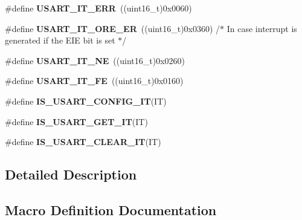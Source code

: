 \begin{DoxyCompactItemize}
\item 
\#define {\bfseries U\+S\+A\+R\+T\+\_\+\+I\+T\+\_\+\+E\+RR}~((uint16\+\_\+t)0x0060)\hypertarget{group___u_s_a_r_t___interrupt__definition_ga631e83efd4c4789128d80a9539faf78a}{}\label{group___u_s_a_r_t___interrupt__definition_ga631e83efd4c4789128d80a9539faf78a}

\item 
\#define {\bfseries U\+S\+A\+R\+T\+\_\+\+I\+T\+\_\+\+O\+R\+E\+\_\+\+ER}~((uint16\+\_\+t)0x0360) /$\ast$ In case interrupt is generated if the E\+I\+E bit is set $\ast$/\hypertarget{group___u_s_a_r_t___interrupt__definition_ga1faa2d618b7c1038f8cad50fec7d0ba4}{}\label{group___u_s_a_r_t___interrupt__definition_ga1faa2d618b7c1038f8cad50fec7d0ba4}

\item 
\#define {\bfseries U\+S\+A\+R\+T\+\_\+\+I\+T\+\_\+\+NE}~((uint16\+\_\+t)0x0260)\hypertarget{group___u_s_a_r_t___interrupt__definition_gad5de042f579b50f1e8643009176486b3}{}\label{group___u_s_a_r_t___interrupt__definition_gad5de042f579b50f1e8643009176486b3}

\item 
\#define {\bfseries U\+S\+A\+R\+T\+\_\+\+I\+T\+\_\+\+FE}~((uint16\+\_\+t)0x0160)\hypertarget{group___u_s_a_r_t___interrupt__definition_ga9af8790f78f6cb1591506c57d0cc0fb3}{}\label{group___u_s_a_r_t___interrupt__definition_ga9af8790f78f6cb1591506c57d0cc0fb3}

\item 
\#define {\bfseries I\+S\+\_\+\+U\+S\+A\+R\+T\+\_\+\+C\+O\+N\+F\+I\+G\+\_\+\+IT}(IT)
\item 
\#define {\bfseries I\+S\+\_\+\+U\+S\+A\+R\+T\+\_\+\+G\+E\+T\+\_\+\+IT}(IT)
\item 
\#define {\bfseries I\+S\+\_\+\+U\+S\+A\+R\+T\+\_\+\+C\+L\+E\+A\+R\+\_\+\+IT}(IT)
\end{DoxyCompactItemize}


\subsection{Detailed Description}


\subsection{Macro Definition Documentation}
